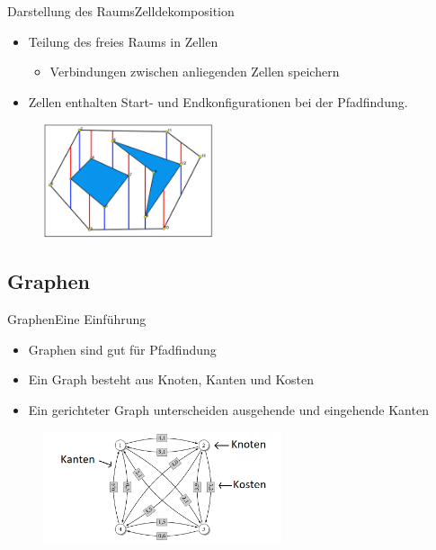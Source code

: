 \documentclass[t,aspectratio=169,dvipsnames]{beamer}
\begin{document}
\begin{frame}{Darstellung des Raums}{Zelldekomposition}
	\begin{itemize}
		\item Teilung des freies Raums in Zellen
		\begin{itemize}
			\item Verbindungen zwischen anliegenden Zellen speichern
		\end{itemize}
	    \item Zellen enthalten Start- und Endkonfigurationen bei der Pfadfindung.
	\end{itemize}
	
	\begin{figure}
		\includegraphics[width=5.0cm]{images/Bild4.png}
	\end{figure}
\end{frame}

\subsection{Graphen}

\begin{frame}{Graphen}{Eine Einführung}
	\begin{itemize}
		\item Graphen sind gut für Pfadfindung
		\item Ein Graph besteht aus Knoten, Kanten und Kosten
		\item Ein gerichteter Graph unterscheiden ausgehende und eingehende Kanten
	\end{itemize}
	
	\begin{figure}
		\includegraphics[width=7.0cm]{images/kk_graph_S6.png}
	\end{figure}
\end{frame}
\end{document}
